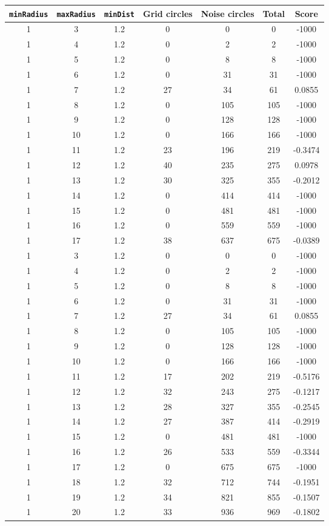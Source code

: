 \documentclass[letterpaper, 12pt]{article}
\begin{document}
\begin{longtable}{|c|c|c|c|c|c|c|}
\hline
\textbf{\texttt{minRadius}} & \textbf{\texttt{maxRadius}} & \textbf{\texttt{minDist}} & \textbf{Grid circles} & \textbf{Noise circles} & \textbf{Total} & \textbf{Score} \\
\hline
1 & 3 & 1.2 & 0 & 0 & 0 & -1000 \\
\hline
1 & 4 & 1.2 & 0 & 2 & 2 & -1000 \\
\hline
1 & 5 & 1.2 & 0 & 8 & 8 & -1000 \\
\hline
1 & 6 & 1.2 & 0 & 31 & 31 & -1000 \\
\hline
1 & 7 & 1.2 & 27 & 34 & 61 & 0.0855 \\
\hline
1 & 8 & 1.2 & 0 & 105 & 105 & -1000 \\
\hline
1 & 9 & 1.2 & 0 & 128 & 128 & -1000 \\
\hline
1 & 10 & 1.2 & 0 & 166 & 166 & -1000 \\
\hline
1 & 11 & 1.2 & 23 & 196 & 219 & -0.3474 \\
\hline
1 & 12 & 1.2 & 40 & 235 & 275 & 0.0978 \\
\hline
1 & 13 & 1.2 & 30 & 325 & 355 & -0.2012 \\
\hline
1 & 14 & 1.2 & 0 & 414 & 414 & -1000 \\
\hline
1 & 15 & 1.2 & 0 & 481 & 481 & -1000 \\
\hline
1 & 16 & 1.2 & 0 & 559 & 559 & -1000 \\
\hline
1 & 17 & 1.2 & 38 & 637 & 675 & -0.0389 \\
\hline
1 & 3 & 1.2 & 0 & 0 & 0 & -1000 \\
\hline
1 & 4 & 1.2 & 0 & 2 & 2 & -1000 \\
\hline
1 & 5 & 1.2 & 0 & 8 & 8 & -1000 \\
\hline
1 & 6 & 1.2 & 0 & 31 & 31 & -1000 \\
\hline
1 & 7 & 1.2 & 27 & 34 & 61 & 0.0855 \\
\hline
1 & 8 & 1.2 & 0 & 105 & 105 & -1000 \\
\hline
1 & 9 & 1.2 & 0 & 128 & 128 & -1000 \\
\hline
1 & 10 & 1.2 & 0 & 166 & 166 & -1000 \\
\hline
1 & 11 & 1.2 & 17 & 202 & 219 & -0.5176 \\
\hline
1 & 12 & 1.2 & 32 & 243 & 275 & -0.1217 \\
\hline
1 & 13 & 1.2 & 28 & 327 & 355 & -0.2545 \\
\hline
1 & 14 & 1.2 & 27 & 387 & 414 & -0.2919 \\
\hline
1 & 15 & 1.2 & 0 & 481 & 481 & -1000 \\
\hline
1 & 16 & 1.2 & 26 & 533 & 559 & -0.3344 \\
\hline
1 & 17 & 1.2 & 0 & 675 & 675 & -1000 \\
\hline
1 & 18 & 1.2 & 32 & 712 & 744 & -0.1951 \\
\hline
1 & 19 & 1.2 & 34 & 821 & 855 & -0.1507 \\
\hline
1 & 20 & 1.2 & 33 & 936 & 969 & -0.1802 \\
\hline
\end{longtable}
\end{document}
